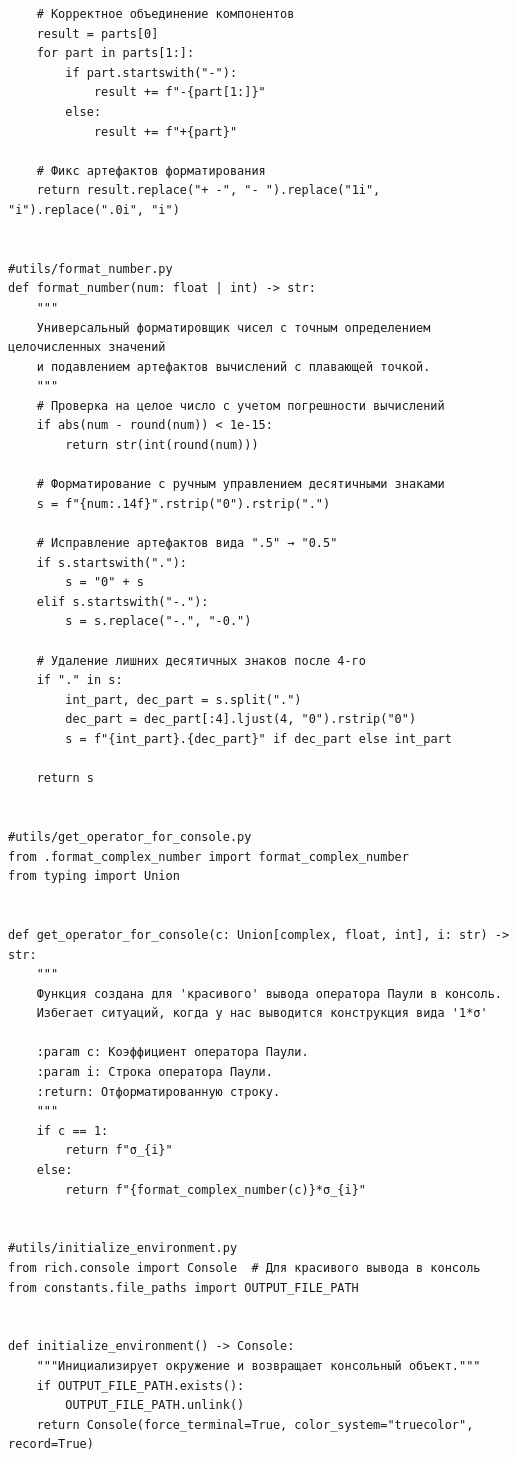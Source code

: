 \documentclass[a4paper]{report}
\begin{document}
\begin{lstlisting}
    # Корректное объединение компонентов
    result = parts[0]
    for part in parts[1:]:
        if part.startswith("-"):
            result += f"-{part[1:]}"
        else:
            result += f"+{part}"

    # Фикс артефактов форматирования
    return result.replace("+ -", "- ").replace("1i", "i").replace(".0i", "i")


#utils/format_number.py
def format_number(num: float | int) -> str:
    """
    Универсальный форматировщик чисел с точным определением целочисленных значений
    и подавлением артефактов вычислений с плавающей точкой.
    """
    # Проверка на целое число с учетом погрешности вычислений
    if abs(num - round(num)) < 1e-15:
        return str(int(round(num)))

    # Форматирование с ручным управлением десятичными знаками
    s = f"{num:.14f}".rstrip("0").rstrip(".")

    # Исправление артефактов вида ".5" → "0.5"
    if s.startswith("."):
        s = "0" + s
    elif s.startswith("-."):
        s = s.replace("-.", "-0.")

    # Удаление лишних десятичных знаков после 4-го
    if "." in s:
        int_part, dec_part = s.split(".")
        dec_part = dec_part[:4].ljust(4, "0").rstrip("0")
        s = f"{int_part}.{dec_part}" if dec_part else int_part

    return s


#utils/get_operator_for_console.py
from .format_complex_number import format_complex_number
from typing import Union


def get_operator_for_console(c: Union[complex, float, int], i: str) -> str:
    """
    Функция создана для 'красивого' вывода оператора Паули в консоль.
    Избегает ситуаций, когда у нас выводится конструкция вида '1*σ'

    :param c: Коэффициент оператора Паули.
    :param i: Строка оператора Паули.
    :return: Отформатированную строку.
    """
    if c == 1:
        return f"σ_{i}"
    else:
        return f"{format_complex_number(c)}*σ_{i}"


#utils/initialize_environment.py
from rich.console import Console  # Для красивого вывода в консоль
from constants.file_paths import OUTPUT_FILE_PATH


def initialize_environment() -> Console:
    """Инициализирует окружение и возвращает консольный объект."""
    if OUTPUT_FILE_PATH.exists():
        OUTPUT_FILE_PATH.unlink()
    return Console(force_terminal=True, color_system="truecolor", record=True)



\end{lstlisting}
\end{document}
